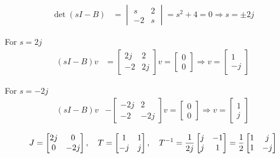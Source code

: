 \documentclass[12pt,a4paper]{article}
\begin{document}
\begin{align*}
	\det (sI - B) &= \begin{vmatrix}
		s & 2 \\ -2 & s
	\end{vmatrix} = s^2 + 4 = 0 \Rightarrow s= \pm 2j
\end{align*}

For $s = 2j$
\begin{align*}
	(sI - B)v &= \begin{bmatrix}
		2j & 2 \\ -2 & 2j
	\end{bmatrix}v = \begin{bmatrix}
	0 \\ 0
	\end{bmatrix}\Rightarrow v = \begin{bmatrix}
	1 \\ -j
	\end{bmatrix}
\end{align*}

For $s = -2j$
\begin{align*}
	(sI - B)v &- \begin{bmatrix}
		-2j & 2 \\ -2 & -2j
	\end{bmatrix}v = \begin{bmatrix}
	0 \\ 0
	\end{bmatrix} \Rightarrow v = \begin{bmatrix}
	1 \\ j
	\end{bmatrix}
\end{align*}

\[
J = \begin{bmatrix}
	2j & 0 \\
	0	& -2j
\end{bmatrix}, \quad T = \begin{bmatrix}
1 & 1 \\ -j & j
\end{bmatrix}, \quad T^{-1} = {1\over2j} \begin{bmatrix}
j & -1 \\ j & 1
\end{bmatrix} = {1\over2} \begin{bmatrix}
1 & j\\ 1 & -j
\end{bmatrix}
\]
\end{document}
